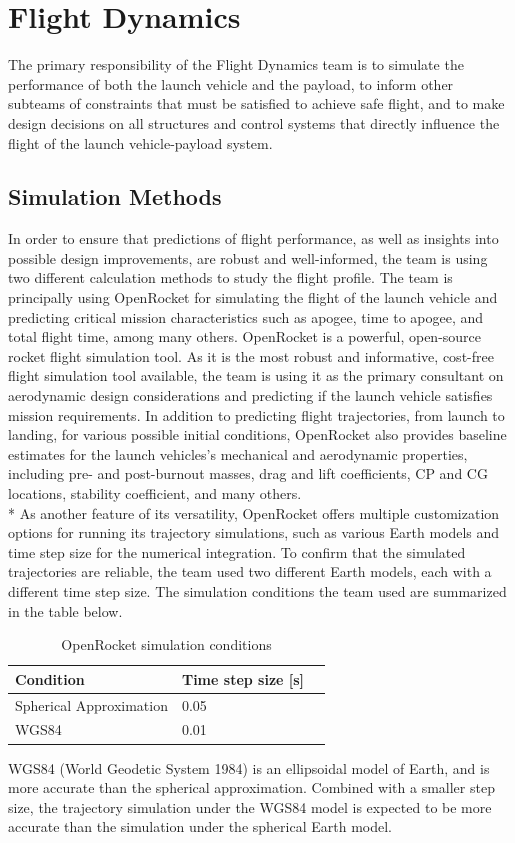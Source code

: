 \chapter{Flight Dynamics}
The primary responsibility of the Flight Dynamics team is to simulate the performance of both the launch vehicle and the payload, to inform other subteams of constraints that must be satisfied to achieve safe flight, and to make design decisions on all structures and control systems that directly influence the flight of the launch vehicle-payload system.

\section{Simulation Methods}
In order to ensure that predictions of flight performance, as well as insights into possible design improvements, are robust and well-informed, the team is using two different calculation methods to study the flight profile. The team is principally using OpenRocket for simulating the flight of the launch vehicle and predicting critical mission characteristics such as apogee, time to apogee, and total flight time, among many others. OpenRocket is a powerful, open-source rocket flight simulation tool. As it is the most robust and informative, cost-free flight simulation tool available, the team is using it as the primary consultant on aerodynamic design considerations and predicting if the launch vehicle satisfies mission requirements. In addition to predicting flight trajectories, from launch to landing, for various possible initial conditions, OpenRocket also provides baseline estimates for the launch vehicles's mechanical and aerodynamic properties, including pre- and post-burnout masses, drag and lift coefficients, CP and CG locations, stability coefficient, and many others. 
\\*
\newline
As another feature of its versatility, OpenRocket offers multiple customization options for running its trajectory simulations, such as various Earth models and time step size for the numerical integration. To confirm that the simulated trajectories are reliable, the team used two different Earth models, each with a different time step size. The simulation conditions the team used are summarized in the table below.
\FloatBarrier
\begin{table}[H]
\centering
 \caption{OpenRocket simulation conditions}
 \label{tab:FlightDynamics:SimulationConditions}
\begin{tabularx}{.5\linewidth}{llX}
\toprule
 \textbf{Condition} &  \textbf{Time step size [s]} \\
\midrule
   Spherical Approximation &    0.05 \\
    WGS84 &     0.01 \\
\bottomrule
\end{tabularx}
\end{table}
WGS84 (World Geodetic System 1984) is an ellipsoidal model of Earth, and is more accurate than the spherical approximation. Combined with a smaller step size, the trajectory simulation under the WGS84 model is expected to be more accurate than the simulation under the spherical Earth model.

